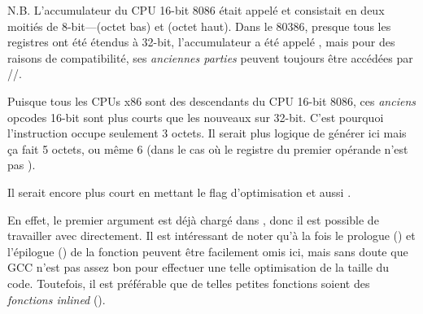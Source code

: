 N.B.  L'accumulateur du CPU 16-bit 8086 était appelé \AX et consistait en deux moitiés
de 8-bit---\AL (octet bas) et \AH (octet haut).
Dans le 80386, presque tous les registres ont été étendus à 32-bit, l'accumulateur
a été appelé \EAX, mais pour des raisons de compatibilité, ses \emph{anciennes parties}
peuvent toujours être accédées par \AX/\AH/\AL.

Puisque tous les CPUs x86 sont des descendants du CPU 16-bit 8086, ces \emph{anciens}
opcodes 16-bit sont plus courts que les nouveaux sur 32-bit.
C'est pourquoi l'instruction  occupe seulement 3 octets.
Il serait plus logique de générer ici   mais ça fait 5 octets,
ou même 6 (dans le cas où le registre du premier opérande n'est pas \EAX).


Il serait encore plus court en mettant le flag d'optimisation \Othree et aussi .




En effet, le premier argument est déjà chargé dans \EAX, donc il est possible de
travailler avec directement.
Il est intéressant de noter qu'à la fois le prologue ()
et l'épilogue () de la fonction peuvent être facilement omis ici, mais
sans doute que GCC n'est pas assez bon pour effectuer une telle optimisation de la
taille du code.
Toutefois, il est préférable que de telles petites fonctions soient des \emph{fonctions
inlined} ().
